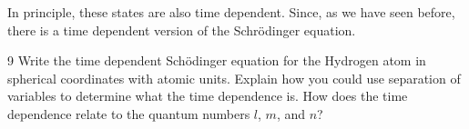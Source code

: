 \documentclass{article}
\begin{document}
\noindent In principle, these states are also time dependent.  Since, as we have seen before, there is a time dependent version of the Schr\"odinger equation. 

\begin{problem}{}{9}
Write the time dependent Sch\"odinger equation for the Hydrogen atom in spherical coordinates with atomic units. Explain how you could use separation of variables to determine what the time dependence is.  How does the time dependence relate to the quantum numbers $l$, $m$, and $n$?
\end{problem}
\end{document}
